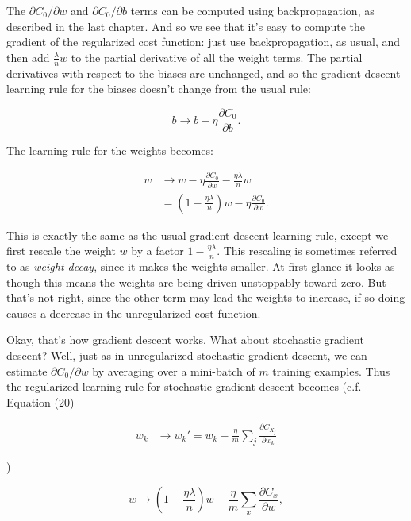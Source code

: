 \noindent The $\partial C_0 / \partial w$ and $\partial C_0 / \partial b$ terms can be computed using backpropagation, as described in the last chapter. And so we see that it's easy to compute the gradient of the regularized cost function: just use backpropagation, as usual, and then add $\frac{\lambda}{n} w$ to the partial derivative of all the weight terms. The partial derivatives with respect to the biases are unchanged, and so the gradient descent learning rule for the biases doesn't change from the usual rule:

\begin{equation}
b \rightarrow b -\eta \frac{\partial C_0}{\partial b}.
\tag{90}
\end{equation}

\noindent The learning rule for the weights becomes:

\begin{align}
w &\rightarrow w-\eta \frac{\partial C_0}{\partial w}-\frac{\eta \lambda}{n} w \tag{91} \\ &= \left(1-\frac{\eta \lambda}{n}\right) w -\eta \frac{\partial C_0}{\partial w}. \tag{92}
\end{align}

\noindent This is exactly the same as the usual gradient descent learning rule, except we first rescale the weight $w$ by a factor $1-\frac{\eta \lambda}{n}$. This rescaling is sometimes referred to as \emph{weight decay}, since it makes the weights smaller. At first glance it looks as though this means the weights are being driven unstoppably toward zero. But that's not right, since the other term may lead the weights to increase, if so doing causes a decrease in the unregularized cost function.


Okay, that's how gradient descent works. What about stochastic gradient descent? Well, just as in unregularized stochastic gradient descent, we can estimate $\partial C_0 / \partial w$ by averaging over a mini-batch of $m$ training examples. Thus the regularized learning rule for stochastic gradient descent becomes (c.f. Equation (20)

\begin{align*}
w_k &\rightarrow w_k' = w_k-\frac{\eta}{m} \sum_j \frac{\partial C_{X_j}}{\partial w_k} \nonumber
\end{align*}

\noindent )

\begin{equation}
w \rightarrow \left(1-\frac{\eta \lambda}{n}\right) w -\frac{\eta}{m} \sum_x \frac{\partial C_x}{\partial w},
\tag{93}
\end{equation}

